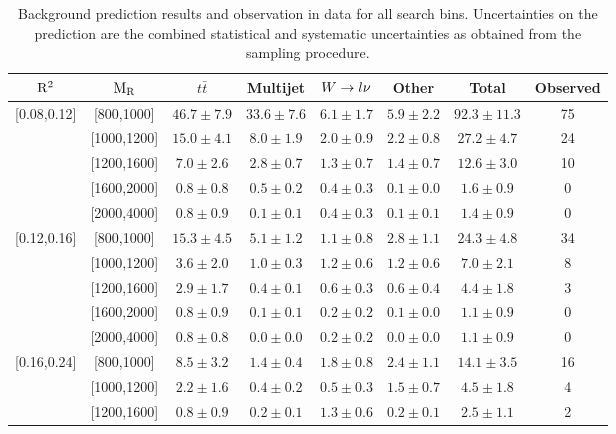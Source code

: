 \begin{table}[htpb]
\centering
\caption{Background prediction results and observation in data for all search bins. Uncertainties on the prediction are the combined statistical and systematic uncertainties as obtained from the sampling procedure. \label{tab:results_prediction}}
\vspace{1ex}
{\small
\begin{tabular}{ c  c | c  c  c  c | c | c }
\toprule
$\mathrm{R^2}$ & $\mathrm{M_R}$& $t\bar{t}$ & Multijet & $W\rightarrow l \nu$ & Other & Total & Observed\\ 
\midrule
\multirow{5}{*}{[0.08,0.12]} & [800,1000] & $46.7 \pm 7.9$ & $33.6 \pm 7.6$ & $6.1 \pm 1.7$ & $5.9 \pm 2.2$ & $92.3 \pm 11.3$ & 75 \\ 
 & [1000,1200] & $15.0 \pm 4.1$ & $8.0 \pm 1.9$ & $2.0 \pm 0.9$ & $2.2 \pm 0.8$ & $27.2 \pm 4.7$ & 24 \\ 
 & [1200,1600] & $7.0 \pm 2.6$ & $2.8 \pm 0.7$ & $1.3 \pm 0.7$ & $1.4 \pm 0.7$ & $12.6 \pm 3.0$ & 10 \\ 
 & [1600,2000] & $0.8 \pm 0.8$ & $0.5 \pm 0.2$ & $0.4 \pm 0.3$ & $0.1 \pm 0.0$ & $1.6 \pm 0.9$ & 0 \\ 
 & [2000,4000] & $0.8 \pm 0.9$ & $0.1 \pm 0.1$ & $0.4 \pm 0.3$ & $0.1 \pm 0.1$ & $1.4 \pm 0.9$ & 0 \\ 
\midrule 
\multirow{5}{*}{[0.12,0.16]} & [800,1000] & $15.3 \pm 4.5$ & $5.1 \pm 1.2$ & $1.1 \pm 0.8$ & $2.8 \pm 1.1$ & $24.3 \pm 4.8$ & 34 \\ 
 & [1000,1200] & $3.6 \pm 2.0$ & $1.0 \pm 0.3$ & $1.2 \pm 0.6$ & $1.2 \pm 0.6$ & $7.0 \pm 2.1$ & 8 \\ 
 & [1200,1600] & $2.9 \pm 1.7$ & $0.4 \pm 0.1$ & $0.6 \pm 0.3$ & $0.6 \pm 0.4$ & $4.4 \pm 1.8$ & 3 \\ 
 & [1600,2000] & $0.8 \pm 0.9$ & $0.1 \pm 0.1$ & $0.2 \pm 0.2$ & $0.1 \pm 0.0$ & $1.1 \pm 0.9$ & 0 \\ 
 & [2000,4000] & $0.8 \pm 0.8$ & $0.0 \pm 0.0$ & $0.2 \pm 0.2$ & $0.0 \pm 0.0$ & $1.1 \pm 0.9$ & 0 \\ 
\midrule 
\multirow{5}{*}{[0.16,0.24]} & [800,1000] & $8.5 \pm 3.2$ & $1.4 \pm 0.4$ & $1.8 \pm 0.8$ & $2.4 \pm 1.1$ & $14.1 \pm 3.5$ & 16 \\ 
 & [1000,1200] & $2.2 \pm 1.6$ & $0.4 \pm 0.2$ & $0.5 \pm 0.3$ & $1.5 \pm 0.7$ & $4.5 \pm 1.8$ & 4 \\ 
 & [1200,1600] & $0.8 \pm 0.9$ & $0.2 \pm 0.1$ & $1.3 \pm 0.6$ & $0.2 \pm 0.1$ & $2.5 \pm 1.1$ & 2 \\ 

\end{tabular}}
\end{table}
